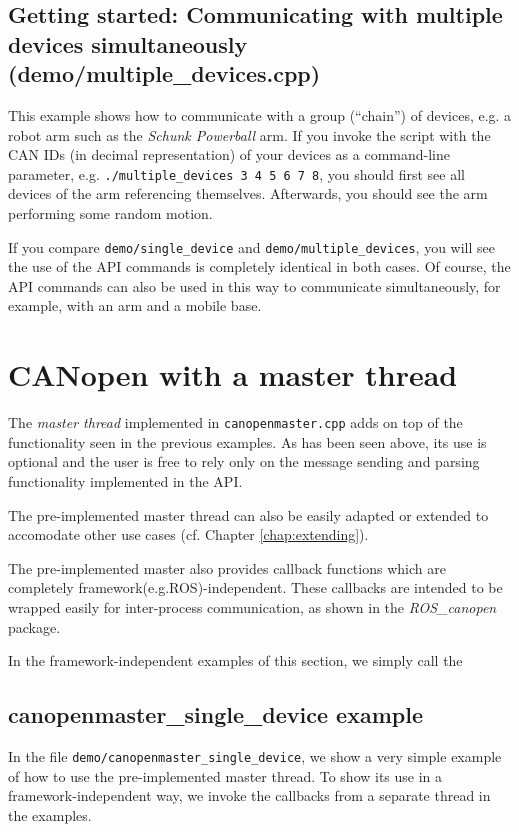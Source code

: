 \subsection{Getting started: Communicating with multiple devices simultaneously (demo/multiple\_devices.cpp)}

This example shows how to communicate with a group (``chain'') of devices, e.g. a robot arm such as the {\em Schunk Powerball} arm. If you invoke the script with the CAN IDs (in decimal representation) of your devices as a command-line parameter, e.g. \texttt{./multiple\_devices 3 4 5 6 7 8}, you should first see all devices of the arm referencing themselves. Afterwards, you should see the arm performing some random motion.

If you compare \texttt{demo/single\_device} and \texttt{demo/multiple\_devices}, you will see the use of the API commands is completely identical in both cases. Of course, the API commands can also be used in this way to communicate simultaneously, for example, with an arm and a mobile base.

\section{CANopen with a master thread}

The {\em master thread} implemented in \texttt{canopenmaster.cpp} adds on top of the functionality seen in the previous examples. As has been seen above, its use is optional and the user is free to rely only on the message sending and parsing functionality implemented in the API.

The pre-implemented master thread can also be easily adapted or extended to accomodate other use cases (cf. Chapter \ref{chap:extending}).

The pre-implemented master also provides callback functions which are completely framework(e.g.ROS)-independent. These callbacks are intended to be wrapped easily for inter-process communication, as shown in the  {\em ROS\_canopen} package. 

In the framework-independent examples of this section, we simply call the 

\subsection{canopenmaster\_single\_device example}

In the file \texttt{demo/canopenmaster\_single\_device}, we show a very simple example of how to use the pre-implemented master thread. To show its use in a framework-independent way, we invoke the callbacks from a separate thread in the examples. 

